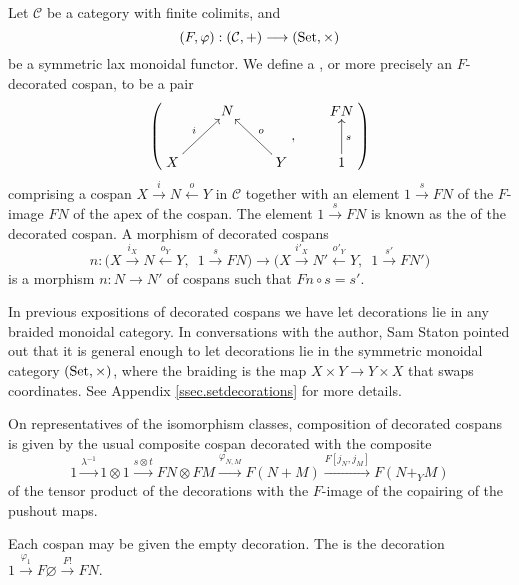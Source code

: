 \begin{definition} \label{def:fcospanss}
  Let $\mathcal C$ be a category with finite colimits, and
  \[
    (F,\varphi): (\mathcal C,+) \longrightarrow (\mathrm{Set}, \times)
  \]
  be a symmetric lax monoidal functor. We define a , or more
  precisely an $F$-decorated cospan, to be a pair 
  \[
    \left(
    \begin{aligned}
      \xymatrix{
	& N \\  
	X \ar[ur]^{i} && Y \ar[ul]_{o}
      }
    \end{aligned}
    ,
    \qquad
    \begin{aligned}
      \xymatrix{
	FN \\
	1 \ar[u]_{s}
      }
    \end{aligned}
    \right)
  \]
  comprising a cospan $X \stackrel{i}\rightarrow N \stackrel{o}\leftarrow Y$ in
  $\mathcal C$ together with an element $1 \stackrel{s}\rightarrow FN$ of
  the $F$-image $FN$ of the apex of the cospan. The element $1
  \stackrel{s}\rightarrow FN$ is known as the  of the decorated
  cospan. A morphism of decorated cospans 
  \[
    n: \big(X \stackrel{i_X}\longrightarrow N \stackrel{o_Y}\longleftarrow
    Y,\enspace 1 \stackrel{s}\longrightarrow FN\big) \longrightarrow \big(X
    \stackrel{i'_X}\longrightarrow N' \stackrel{o'_Y}\longleftarrow Y,\enspace 1
    \stackrel{s'}\longrightarrow FN'\big)
  \]
  is a morphism $n: N \to N'$ of cospans such that $Fn \circ s = s'$.
\end{definition}

In previous expositions of decorated cospans we have let decorations lie in any
braided monoidal category. In conversations with the author, Sam Staton pointed
out that it is general enough to let decorations lie in the symmetric monoidal
category $(\mathrm{Set},\times)$, where the braiding is the map $X \times Y \to Y \times
X$ that swaps coordinates. See Appendix \ref{ssec.setdecorations} for more details.


On representatives of the isomorphism classes, composition of decorated
cospans is given by the usual composite cospan decorated with the composite
\[
  1 \stackrel{\lambda^{-1}}\longrightarrow 1 \otimes 1 \stackrel{s \otimes
  t}\longrightarrow FN \otimes FM \stackrel{\varphi_{N,M}}\longrightarrow
  F(N+M) \stackrel{F[j_N,j_M]}\longrightarrow F(N+_YM)
\]
of the tensor product of the decorations with the $F$-image of the copairing
of the pushout maps.

Each cospan may be given the empty decoration. The  is the
decoration $1 \stackrel{\varphi_1}{\rightarrow} F\varnothing
\stackrel{F!}{\rightarrow} FN$.

